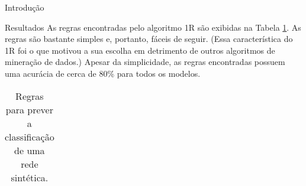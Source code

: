 \begin{section}{Introdução}
\begin{subsection}{Resultados}
As regras encontradas pelo algoritmo 1R são exibidas na Tabela \ref{tab:rules}. As regras são bastante simples e, portanto, fáceis de seguir. (Essa característica do 1R foi o que motivou a sua escolha em detrimento de outros algoritmos de mineração de dados.) Apesar da simplicidade, as regras encontradas possuem uma acurácia de cerca de 80\% para todos os modelos.


\begin{table}
\caption{Regras para prever a classificação de uma rede sintética.}
\centering
\begin{tabular}{|l|l|l|}
\end{tabular}
\label{tab:rules}
\end{table}


\end{subsection}

\end{section}

